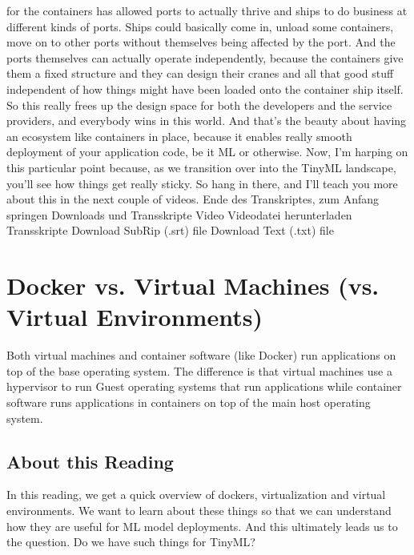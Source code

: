 {{{{{    for the containers has allowed ports to actually thrive
    and ships to do business at different kinds of ports.
    Ships could basically come in, unload some containers, move on to other ports
    without themselves being affected by the port.
    And the ports themselves can actually operate independently,
    because the containers give them a fixed structure
    and they can design their cranes and all that good stuff independent
    of how things might have been loaded onto the container ship itself.
    So this really frees up the design space for both the developers and the service
    providers, and everybody wins in this world.
    And that's the beauty about having an ecosystem like containers
    in place, because it enables really smooth deployment of your application
    code, be it ML or otherwise.
    Now, I'm harping on this particular point
    because, as we transition over into the TinyML landscape,
    you'll see how things get really sticky.
    So hang in there, and I'll teach you more about this
    in the next couple of videos.
    Ende des Transkriptes, zum Anfang springen
    Downloads und Transskripte
    Video
    Videodatei herunterladen
    Transskripte
    Download SubRip (.srt) file
    Download Text (.txt) file

\section{Docker vs. Virtual Machines (vs. Virtual Environments)}
    
    
    Both virtual machines and container software (like Docker) run applications on top of the base operating system. The difference is that virtual machines use a hypervisor to run Guest operating systems that run applications while container software runs applications in containers on top of the main host operating system.
    
    \subsection{About this Reading}
    
    In this reading, we get a quick overview of dockers, virtualization and virtual environments. We want to learn about these things so that we can understand how they are useful for ML model deployments. And this ultimately leads us to the question. Do we have such things for TinyML?
    
}}}}}
